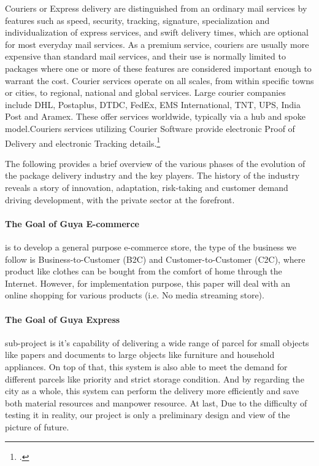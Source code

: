 Couriers or Express delivery are distinguished from an ordinary mail services by features such as speed, security, tracking, signature, specialization and individualization of express services, and swift delivery times, which are optional for most everyday mail services. As a premium service, couriers are usually more expensive than standard mail services, and their use is normally limited to packages where one or more of these features are considered important enough to warrant the cost. Courier services operate on all scales, from within specific towns or cities, to regional, national and global services. Large courier companies include DHL, Postaplus, DTDC, FedEx, EMS International, TNT, UPS, India Post and Aramex. These offer services worldwide, typically via a hub and spoke model.Couriers services utilizing Courier Software provide electronic Proof of Delivery and electronic Tracking details.\footcite{wikiexpress}

The following provides a brief overview of the various phases of the evolution of the package delivery industry and the key players.  The history of the industry reveals a story of innovation, adaptation, risk-taking and customer demand driving development, with the private sector at the forefront.

\paragraph{The Goal of Guya E-commerce} is to develop a general purpose e-commerce store, the type of the business we follow is Business-to-Customer (B2C) and 	Customer-to-Customer (C2C), where product like clothes can be bought from the comfort of home through the Internet. However, for implementation purpose, this paper will deal with an online shopping for various products (i.e. No media streaming store).

\paragraph{The Goal of Guya Express} sub-project is it's capability of delivering a wide range of parcel for small objects like papers and documents to large objects like furniture and household appliances. On top of that, this system is also able to meet the demand for different parcels like priority and strict storage condition. And by  regarding the city as a whole, this system can perform the delivery more efficiently and save both material resources and manpower resource. At last, Due to the difficulty of testing it in reality, our project is only a preliminary design and view of the picture of future.

